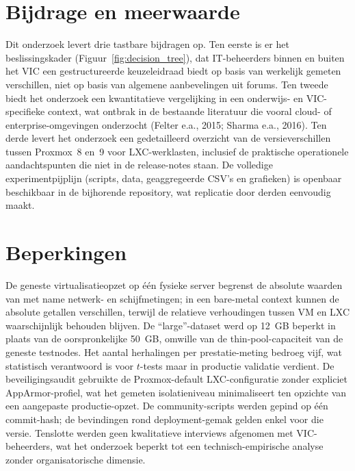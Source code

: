 \section{Bijdrage en meerwaarde}

Dit onderzoek levert drie tastbare bijdragen op. Ten eerste is er het beslissingskader (Figuur~\ref{fig:decision_tree}), dat IT-beheerders binnen en buiten het VIC een gestructureerde keuzeleidraad biedt op basis van werkelijk gemeten verschillen, niet op basis van algemene aanbevelingen uit forums. Ten tweede biedt het onderzoek een kwantitatieve vergelijking in een onderwijs- en VIC-specifieke context, wat ontbrak in de bestaande literatuur die vooral cloud- of enterprise-omgevingen onderzocht (Felter e.a., 2015; Sharma e.a., 2016). Ten derde levert het onderzoek een gedetailleerd overzicht van de versieverschillen tussen Proxmox~8 en~9 voor LXC-werklasten, inclusief de praktische operationele aandachtspunten die niet in de release-notes staan. De volledige experimentpijplijn (scripts, data, geaggregeerde CSV's en grafieken) is openbaar beschikbaar in de bijhorende repository, wat replicatie door derden eenvoudig maakt.

\section{Beperkingen}

De geneste virtualisatieopzet op één fysieke server begrenst de absolute waarden van met name netwerk- en schijfmetingen; in een bare-metal context kunnen de absolute getallen verschillen, terwijl de relatieve verhoudingen tussen VM en LXC waarschijnlijk behouden blijven. De ``large''-dataset werd op 12~GB beperkt in plaats van de oorspronkelijke 50~GB, omwille van de thin-pool-capaciteit van de geneste testnodes. Het aantal herhalingen per prestatie-meting bedroeg vijf, wat statistisch verantwoord is voor $t$-tests maar in productie validatie verdient. De beveiligingsaudit gebruikte de Proxmox-default LXC-configuratie zonder expliciet AppArmor-profiel, wat het gemeten isolatieniveau minimaliseert ten opzichte van een aangepaste productie-opzet. De community-scripts werden gepind op één commit-hash; de bevindingen rond deployment-gemak gelden enkel voor die versie. Tenslotte werden geen kwalitatieve interviews afgenomen met VIC-beheerders, wat het onderzoek beperkt tot een technisch-empirische analyse zonder organisatorische dimensie.


